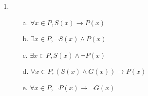 \begin{enumerate}
        \item
            \begin{itemize}
                \item[a.]   $\forall x \in P, S(x) \to P(x)$
                \item[b.]   $\exists x \in P, \neg S(x) \land P(x)$
                \item[c.]   $\exists x \in P, S(x) \land \neg P(x)$
                \item[d.]   $\forall x \in P, (S(x) \land G(x)) \to P(x)$
                \item[e.]   $\forall x \in P, \neg P(x) \to \neg G(x)$
            \end{itemize}
    \end{enumerate}


